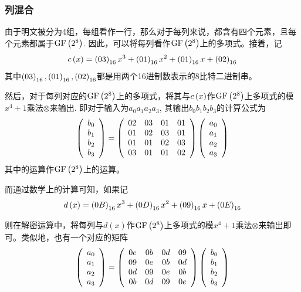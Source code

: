\subsubsection{列混合}
由于明文被分为4组，每组看作一行，那么对于每列来说，都含有四个元素，且每个元素都属于$\mathrm{GF}\left( {2^8}\right)$. 因此，可以将每列看作$\mathrm{GF}\left( {2^8}\right)$上的多项式。接着，记
\begin{equation}
c\left( {x}\right)=\left( {03}\right)_{16}x^3+\left( {01}\right)_{16}x^2+\left( {01}\right)_{16}x+\left( {02}\right)_{16}
\end{equation}
其中$\left( {03}\right)_{16}, \left( {01}\right)_{16}, \left( {02}\right)_{16}$都是用两个16进制数表示的8比特二进制串。\par
然后，对于每列对应的$\mathrm{GF}\left( {2^8}\right)$上的多项式，将其与$c\left( {x}\right)$作$\mathrm{GF}\left( {2^8}\right)$上多项式的模$x^4+1$乘法$\otimes$来输出. 即对于输入为$a_0a_1a_2a_3$, 其输出$b_0b_1b_2b_3$的计算公式为
\begin{equation}
\left( {\begin{array}{c}b_0\\b_1\\b_2\\b_3\end{array}}\right)=\left( {\begin{array}{cccc}02&03&01&01\\01&02&03&01\\01&01&02&03\\03&01&01&02\end{array}}\right)\left( {\begin{array}{c}a_0\\a_1\\a_2\\a_3\end{array}}\right)
\end{equation}
其中的运算作$\mathrm{GF}\left( {2^8}\right)$上的运算。\par
而通过数学上的计算可知，如果记
\begin{equation}
d\left( {x}\right)=\left( {0B}\right)_{16}x^3+\left( {0D}\right)_{16}x^2+\left( {09}\right)_{16}x+\left( {0E}\right)_{16}
\end{equation}

则在解密运算中，将每列与$d(x)$作$\mathrm{GF}\left( {2^8}\right)$上多项式的模$x^4+1$乘法$\otimes$来输出即可。类似地，也有一个对应的矩阵
\begin{equation}
\left( {\begin{array}{c}a_0\\a_1\\a_2\\a_3\end{array}}\right)=\left( {\begin{array}{cccc}0e&0b&0d&09\\09&0e&0b&0d\\0d&09&0e&0b\\0b&0d&09&0e\end{array}}\right)\left( {\begin{array}{c}b_0\\b_1\\b_2\\b_3\end{array}}\right)
\end{equation}

